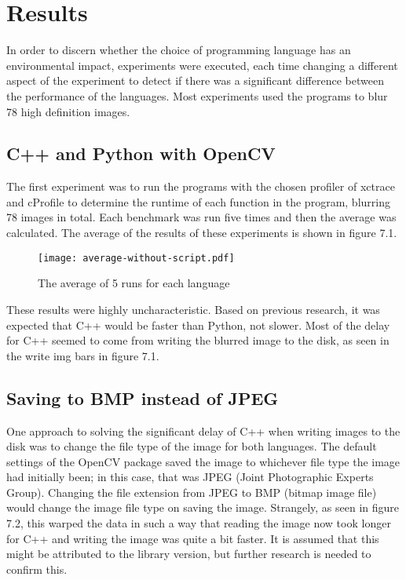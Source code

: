 \chapter{Results}
In order to discern whether the choice of programming language has an environmental impact, experiments were executed, each time changing a different aspect of the experiment to detect if there was a significant difference between the performance of the languages. Most experiments used the programs to blur 78 high definition images.

\section{C++ and Python with OpenCV }
The first experiment was to run the programs with the chosen profiler of xctrace and cProfile to determine the runtime of each function in the program, blurring 78 images in total. Each benchmark was run five times and then the average was calculated. The average of the results of these experiments is shown in figure 7.1.

\begin{figure}[H]
	\centering
	\texttt{[image: average-without-script.pdf]}
	\caption{The average of 5 runs for each language}
	\label{figure:average-78img}
\end{figure}

These results were highly uncharacteristic. Based on previous research, it was expected that C++ would be faster than Python, not slower. Most of the delay for C++ seemed to come from writing the blurred image to the disk, as seen in the write img bars in figure 7.1.

\section{Saving to BMP instead of JPEG}
One approach to solving the significant delay of C++ when writing images to the disk was to change the file type of the image for both languages. The default settings of the OpenCV package saved the image to whichever file type the image had initially been; in this case, that was JPEG (Joint Photographic Experts Group). Changing the file extension from JPEG to BMP (bitmap image file) would change the image file type on saving the image. Strangely, as seen in figure 7.2, this warped the data in such a way that reading the image now took longer for C++ and writing the image was quite a bit faster. It is assumed that this might be attributed to the library version, but further research is needed to confirm this.

